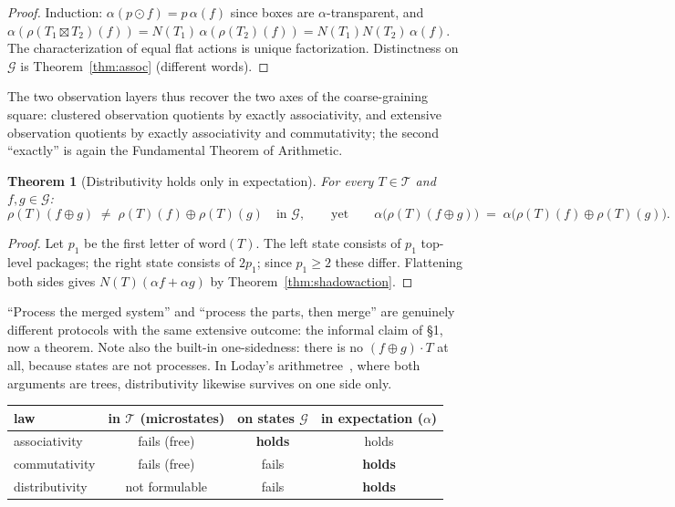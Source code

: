 \documentclass[11pt]{article}
\newcommand{\cT}{\mathcal{T}}   %
\newcommand{\cG}{\mathcal{G}}   %
\newcommand{\act}{\rho}
\numberwithin{equation}{section}
\theoremstyle{plain}
\newtheorem{theorem}{Theorem}[section]
\theoremstyle{definition}
\theoremstyle{remark}
\begin{document}
\begin{proof}
Induction: $\alpha(p \odot f) = p\,\alpha(f)$ since boxes are $\alpha$-transparent,
and $\alpha(\act(T_1\boxtimes T_2)(f)) = N(T_1)\,\alpha(\act(T_2)(f)) =
N(T_1)N(T_2)\,\alpha(f)$. The characterization of equal flat actions is unique
factorization. Distinctness on $\cG$ is Theorem~\ref{thm:assoc} (different words).
\end{proof}

The two observation layers thus recover the two axes of the coarse-graining square:
clustered observation quotients by exactly associativity, and extensive observation
quotients by exactly associativity and commutativity; the second ``exactly'' is
again the Fundamental Theorem of Arithmetic.

\begin{theorem}[Distributivity holds only in expectation]\label{thm:distrib}
For every $T \in \cT$ and $f, g \in \cG$:
\[
\act(T)(f \oplus g) \;\neq\; \act(T)(f) \oplus \act(T)(g)
\quad\text{in } \cG,
\qquad\text{yet}\qquad
\alpha\bigl(\act(T)(f \oplus g)\bigr) \;=\;
\alpha\bigl(\act(T)(f) \oplus \act(T)(g)\bigr).
\]
\end{theorem}

\begin{proof}
Let $p_1$ be the first letter of $\mathrm{word}(T)$. The left state consists of $p_1$
top-level packages; the right state consists of $2p_1$; since $p_1 \ge 2$ these
differ. Flattening both sides gives $N(T)(\alpha f + \alpha g)$ by
Theorem~\ref{thm:shadowaction}.
\end{proof}

``Process the merged system'' and ``process the parts, then merge'' are genuinely
different protocols with the same extensive outcome: the informal claim of \S1,
now a theorem. Note also the built-in one-sidedness: there is no
$(f \oplus g) \cdot T$ at all, because states are not processes. In Loday's
arithmetree~\cite{loday}, where both arguments are trees, distributivity likewise
survives on one side only.

\begin{center}
\begin{tabular}{@{}lccc@{}}
\toprule
law & in $\cT$ (microstates) & on states $\cG$ & in expectation ($\alpha$) \\
\midrule
associativity & fails (free) & \textbf{holds} & holds \\
commutativity & fails (free) & fails & \textbf{holds} \\
distributivity & not formulable & fails & \textbf{holds} \\
\bottomrule
\end{tabular}
\end{center}
\end{document}
